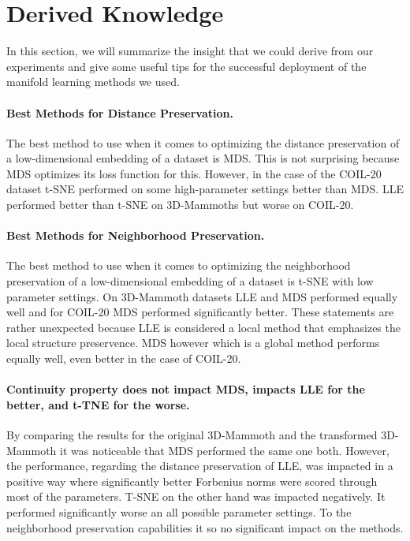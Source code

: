 \newpage

\section{Derived Knowledge}

In this section, we will summarize the insight that we could derive from our experiments and give some useful tips for the successful deployment of the manifold learning methods we used.

\paragraph{Best Methods for Distance Preservation.}
The best method to use when it comes to optimizing the distance preservation of a low-dimensional embedding of a dataset is MDS. This is not surprising because MDS optimizes its loss function for this. However, in the case of the COIL-20 dataset t-SNE performed on some high-parameter settings better than MDS. LLE performed better than t-SNE on 3D-Mammoths but worse on COIL-20.

\paragraph{Best Methods for Neighborhood Preservation.}
The best method to use when it comes to optimizing the neighborhood preservation of a low-dimensional embedding of a dataset is t-SNE with low parameter settings. On 3D-Mammoth datasets LLE and MDS performed equally well and for COIL-20 MDS performed significantly better. These statements are rather unexpected because LLE is considered a local method that emphasizes the local structure preservence. MDS however which is a global method performs equally well, even better in the case of COIL-20.

\paragraph{Continuity property does not impact MDS, impacts LLE for the better, and t-TNE for the worse.}
By comparing the results for the original 3D-Mammoth and the transformed 3D-Mammoth it was noticeable that MDS performed the same one both. However, the performance, regarding the distance preservation of LLE, was impacted in a positive way where significantly better Forbenius norms were scored through most of the parameters. T-SNE on the other hand was impacted negatively. It performed significantly worse an all possible parameter settings. To the neighborhood preservation capabilities it so no significant impact on the methods.

